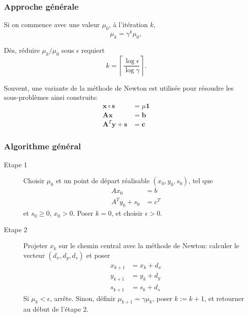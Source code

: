 \documentclass[usepdftitle=false, aspectratio=169]{beamer}
\def\bb{\boldsymbol{b}}
\def\bc{\boldsymbol{c}}
\def\bs{\boldsymbol{s}}
\def\bx{\boldsymbol{x}}
\def\by{\boldsymbol{y}}
\def\bA{\boldsymbol{A}}
\def\bone{\boldsymbol{1}}
\begin{document}
\begin{frame}
	\frametitle{Approche générale}
	
	Si on commence avec une valeur $\mu_0$, à l'itération $k$,
	\[
	\mu_{k} = \gamma^k \mu_0,
	\]
	
	\mbox{}
	
	Dès, réduire $\mu_k/\mu_0$ sous $\epsilon$ requiert
	\[
	k = \left\lceil \frac{\log \epsilon}{\log \gamma} \right\rceil.
	\]
	
	\mbox{}
	
	Souvent, une variante de la méthode de Newton est utilisée pour résoudre les sous-problèmes ainsi construits:
	\begin{align*}
		\bx \circ \bs &= \mu \bone \\
		\bA\bx &= \bb \\
		\bA^T\by + \bs & = \bc
	\end{align*}
	
\end{frame}

\begin{frame}
	\frametitle{Algorithme général}
	
	\begin{description}
		\item[Etape 1]
		Choisir $\mu_0$ et un point de départ réalisable $(x_0, y_0, s_0)$, tel que
		\begin{align*}
			Ax_0 &= b \\
			A^Ty_0 + s_0 &= c^T
		\end{align*}
		et $s_0 \geq 0$, $x_0 > 0$. Poser $k = 0$, et choisir $\epsilon > 0$.
		\item[Etape 2]
		Projeter $x_k$ sur le chemin central avec la méthode de Newton: calculer le vecteur $(d_x, d_y, d_s)$ et poser
		\begin{align*}
			x_{k+1} &= x_k + d_x \\
			y_{k+1} &= y_k + d_y \\
			s_{k+1} &= s_k + d_s
		\end{align*}
		Si $\mu_k < \epsilon$, arrête.
		Sinon, définir $\mu_{k + 1} = \gamma \mu_k$, poser $k := k+1$, et retourner au début de l'étape 2.
	\end{description}
	
\end{frame}
\end{document}
